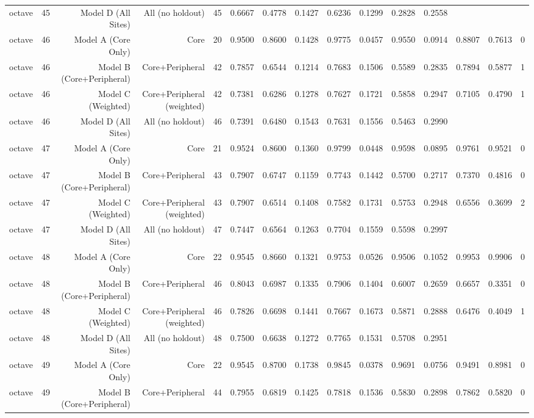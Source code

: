 {\begin{longtable}{lrrrrrrrrrrrrrr}
  octave & 45 & Model D (All Sites) & All (no holdout) & 45 & 0.6667 & 0.4778 & 0.1427 & 0.6236 & 0.1299 & 0.2828 & 0.2558 &  &  &  \\
  octave & 46 & Model A (Core Only) & Core & 20 & 0.9500 & 0.8600 & 0.1428 & 0.9775 & 0.0457 & 0.9550 & 0.0914 & 0.8807 & 0.7613 & 0 \\
  octave & 46 & Model B (Core+Peripheral) & Core+Peripheral & 42 & 0.7857 & 0.6544 & 0.1214 & 0.7683 & 0.1506 & 0.5589 & 0.2835 & 0.7894 & 0.5877 & 1 \\
  octave & 46 & Model C (Weighted) & Core+Peripheral (weighted) & 42 & 0.7381 & 0.6286 & 0.1278 & 0.7627 & 0.1721 & 0.5858 & 0.2947 & 0.7105 & 0.4790 & 1 \\
  octave & 46 & Model D (All Sites) & All (no holdout) & 46 & 0.7391 & 0.6480 & 0.1543 & 0.7631 & 0.1556 & 0.5463 & 0.2990 &  &  &  \\
  octave & 47 & Model A (Core Only) & Core & 21 & 0.9524 & 0.8600 & 0.1360 & 0.9799 & 0.0448 & 0.9598 & 0.0895 & 0.9761 & 0.9521 & 0 \\
  octave & 47 & Model B (Core+Peripheral) & Core+Peripheral & 43 & 0.7907 & 0.6747 & 0.1159 & 0.7743 & 0.1442 & 0.5700 & 0.2717 & 0.7370 & 0.4816 & 0 \\
  octave & 47 & Model C (Weighted) & Core+Peripheral (weighted) & 43 & 0.7907 & 0.6514 & 0.1408 & 0.7582 & 0.1731 & 0.5753 & 0.2948 & 0.6556 & 0.3699 & 2 \\
  octave & 47 & Model D (All Sites) & All (no holdout) & 47 & 0.7447 & 0.6564 & 0.1263 & 0.7704 & 0.1559 & 0.5598 & 0.2997 &  &  &  \\
  octave & 48 & Model A (Core Only) & Core & 22 & 0.9545 & 0.8660 & 0.1321 & 0.9753 & 0.0526 & 0.9506 & 0.1052 & 0.9953 & 0.9906 & 0 \\
  octave & 48 & Model B (Core+Peripheral) & Core+Peripheral & 46 & 0.8043 & 0.6987 & 0.1335 & 0.7906 & 0.1404 & 0.6007 & 0.2659 & 0.6657 & 0.3351 & 0 \\
  octave & 48 & Model C (Weighted) & Core+Peripheral (weighted) & 46 & 0.7826 & 0.6698 & 0.1441 & 0.7667 & 0.1673 & 0.5871 & 0.2888 & 0.6476 & 0.4049 & 1 \\
  octave & 48 & Model D (All Sites) & All (no holdout) & 48 & 0.7500 & 0.6638 & 0.1272 & 0.7765 & 0.1531 & 0.5708 & 0.2951 &  &  &  \\
  octave & 49 & Model A (Core Only) & Core & 22 & 0.9545 & 0.8700 & 0.1738 & 0.9845 & 0.0378 & 0.9691 & 0.0756 & 0.9491 & 0.8981 & 0 \\
  octave & 49 & Model B (Core+Peripheral) & Core+Peripheral & 44 & 0.7955 & 0.6819 & 0.1425 & 0.7818 & 0.1536 & 0.5830 & 0.2898 & 0.7862 & 0.5820 & 0 \\

\end{longtable}}

